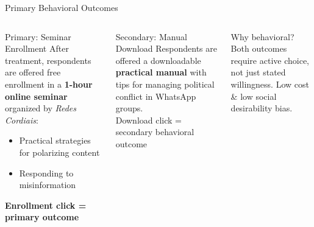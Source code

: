 \documentclass[aspectratio=169]{beamer}
\begin{document}
\begin{frame}{Primary Behavioral Outcomes}
  \begin{columns}[T]
      \begin{block}{Primary: Seminar Enrollment}
        \vspace{0.3em}
        After treatment, respondents are offered free enrollment in a \textbf{1-hour online seminar} organized by \emph{Redes Cordiais}:
        \begin{itemize}
          \item Practical strategies for polarizing content
          \item Responding to misinformation
        \end{itemize}
        \vspace{0.3em}
        \textbf{Enrollment click = primary outcome}
      \end{block}
      \begin{block}{Secondary: Manual Download}
        \vspace{0.3em}
        Respondents are offered a downloadable \textbf{practical manual} with tips for managing political conflict in WhatsApp groups.\\[6pt]
        Download click = secondary behavioral outcome
      \end{block}
      \vspace{0.4em}
      \begin{exampleblock}{Why behavioral?}
        \small Both outcomes require active choice, not just stated willingness. Low cost \& low social desirability bias.
      \end{exampleblock}
  \end{columns}
\end{frame}
\end{document}
